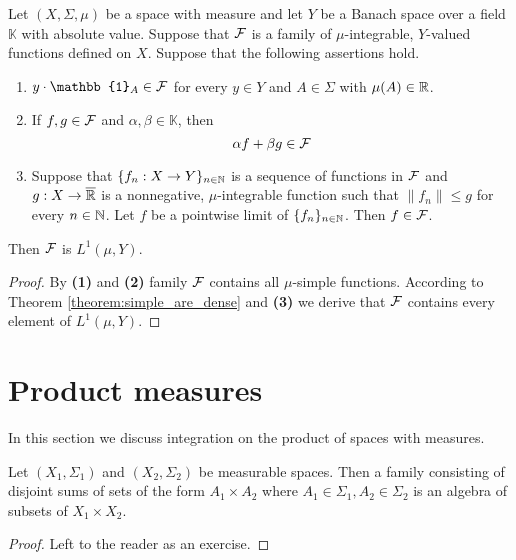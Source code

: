 \begin{corollary}\label{corollary:measurable_induction_for_banach_valued}
Let $(X,\Sigma,\mu)$ be a space with measure and let $Y$ be a Banach space over a field $\mathbb{K}$ with absolute value. Suppose that ${\mathcal F}$ is a family of $\mu$-integrable, $Y$-valued functions defined on $X$. Suppose that the following assertions hold.
\begin{enumerate}[label=\emph{\textbf{(\arabic*)}}, leftmargin=*]
\item $y\cdot \mathbb{1}_A\in \cF$ for every $y\in Y$ and $A\in \Sigma$ with $\mu(A)\in {\mathbb R}$.
\item If $f, g\in {\mathcal F}$ and $\alpha, \beta\in \mathbb{K}$, then
$$\alpha f + \beta g\in {\mathcal F}$$
\item Suppose that $\{f_n:X\rightarrow Y\}_{n\in {\mathbb N}}$ is a sequence of functions in ${\mathcal F}$ and $g:X\rightarrow \overline{{\mathbb R}}$ is a nonnegative, $\mu$-integrable function such that $\lVert f_n\rVert \leq g$ for every $n\in {\mathbb N}$. Let $f$ be a pointwise limit of $\{f_n\}_{n\in {\mathbb N}}$. Then $f\in {\mathcal F}$.
\end{enumerate}
Then ${\mathcal F}$ is $L^1(\mu,Y)$.
\end{corollary}
\begin{proof}
By \textbf{(1)} and \textbf{(2)} family ${\mathcal F}$ contains all $\mu$-simple functions. According to Theorem \ref{theorem:simple_are_dense} and \textbf{(3)} we derive that ${\mathcal F}$ contains every element of $L^1(\mu,Y)$.
\end{proof}

\section{Product measures}
\noindent
In this section we discuss integration on the product of spaces with measures.

\begin{fact}\label{fact:productalgebra}
Let $(X_1,\Sigma_1)$ and $(X_2,\Sigma_2)$ be measurable spaces. Then a family consisting of disjoint sums of sets of the form $A_1\times A_2$ where $A_1\in \Sigma_1, A_2\in \Sigma_2$ is an algebra of subsets of $X_1\times X_2$.
\end{fact}
\begin{proof}
Left to the reader as an exercise.
\end{proof}

